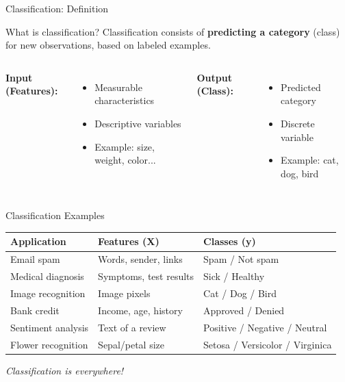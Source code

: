 \documentclass[aspectratio=169]{beamer}
\begin{document}
\begin{frame}{Classification: Definition}
\begin{block}{What is classification?}
Classification consists of \textbf{predicting a category} (class) for new observations, based on labeled examples.
\end{block}

\vspace{0.5cm}
\begin{columns}[T]
\textbf{Input (Features):}
\begin{itemize}
    \item Measurable characteristics
    \item Descriptive variables
    \item Example: size, weight, color...
\end{itemize}

\textbf{Output (Class):}
\begin{itemize}
    \item Predicted category
    \item Discrete variable
    \item Example: cat, dog, bird
\end{itemize}
\end{columns}
\end{frame}

\begin{frame}{Classification Examples}
\begin{center}
\begin{tabular}{|p{3.5cm}|p{4cm}|p{3cm}|}
\hline
\textbf{Application} & \textbf{Features (X)} & \textbf{Classes (y)} \\
\hline
Email spam & Words, sender, links & Spam / Not spam \\
\hline
Medical diagnosis & Symptoms, test results & Sick / Healthy \\
\hline
Image recognition & Image pixels & Cat / Dog / Bird \\
\hline
Bank credit & Income, age, history & Approved / Denied \\
\hline
Sentiment analysis & Text of a review & Positive / Negative / Neutral \\
\hline
Flower recognition & Sepal/petal size & Setosa / Versicolor / Virginica \\
\hline
\end{tabular}
\end{center}

\vspace{0.3cm}
\textit{Classification is everywhere!}
\end{frame}
\end{document}
